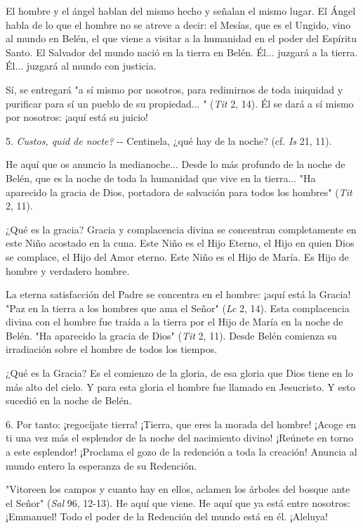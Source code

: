 \begin{body}
\begin{body}
El hombre y el ángel hablan del mismo hecho y señalan el mismo lugar. El Ángel habla de lo que el hombre no se atreve a decir: el Mesías, que es el Ungido, vino al mundo en Belén, el que viene a visitar a la humanidad en el poder del Espíritu Santo. El Salvador del mundo nació en la tierra en Belén. Él... juzgará a la tierra. Él... juzgará al mundo con justicia.

Sí, se entregará "a sí mismo por nosotros, para redimirnos de toda iniquidad y purificar para sí un pueblo de su propiedad... " (\emph{Tit} 2, 14). Él se dará a sí mismo por nosotros: ¡aquí está su juicio!

5. \emph{Custos, quid de nocte?} -\/- Centinela, ¿qué hay de la noche? (cf. \emph{Is} 21, 11).

He aquí que os anuncio la medianoche... Desde lo más profundo de la noche de Belén, que es la noche de toda la humanidad que vive en la tierra... "Ha aparecido la gracia de Dios, portadora de salvación para todos los hombres" (\emph{Tit} 2, 11).

¿Qué es la gracia? Gracia y complacencia divina se concentran completamente en este Niño acostado en la cuna. Este Niño es el Hijo Eterno, el Hijo en quien Dios se complace, el Hijo del Amor eterno. Este Niño es el Hijo de María. Es Hijo de hombre y verdadero hombre.

La eterna satisfacción del Padre se concentra en el hombre: ¡aquí está la Gracia! "Paz en la tierra a los hombres que ama el Señor" (\emph{Lc} 2, 14). Esta complacencia divina con el hombre fue traída a la tierra por el Hijo de María en la noche de Belén. "Ha aparecido la gracia de Dios" (\emph{Tit} 2, 11). Desde Belén comienza su irradiación sobre el hombre de todos los tiempos.

¿Qué es la Gracia? Es el comienzo de la gloria, de esa gloria que Dios tiene en lo más alto del cielo. Y para esta gloria el hombre fue llamado en Jesucristo. Y esto sucedió en la noche de Belén.

6. Por tanto: ¡regocíjate tierra! ¡Tierra, que eres la morada del hombre! ¡Acoge en ti una vez más el esplendor de la noche del nacimiento divino! ¡Reúnete en torno a este esplendor! ¡Proclama el gozo de la redención a toda la creación! Anuncia al mundo entero la esperanza de su Redención.

"Vitoreen los campos y cuanto hay en ellos, aclamen los árboles del bosque ante el Señor" (\emph{Sal} 96, 12-13). He aquí que viene. He aquí que ya está entre nosotros: ¡Emmanuel! Todo el poder de la Redención del mundo está en él. ¡Aleluya!
\end{body} 
	

\end{body}

